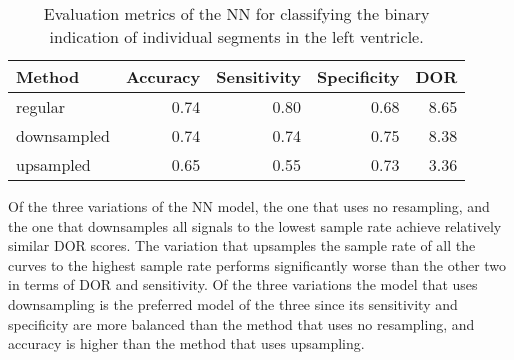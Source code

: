 \begin{table*}[htb]
    \centering
    \begin{tabular}{lrrrr}
        \toprule
        Method      &  Accuracy &  Sensitivity &  Specificity &  DOR \\
        \midrule
        regular     &      0.74 &         0.80 &         0.68 & 8.65 \\
        downsampled &      0.74 &         0.74 &         0.75 & 8.38 \\
        upsampled   &      0.65 &         0.55 &         0.73 & 3.36 \\
        \bottomrule
    \end{tabular}
    \caption{Evaluation metrics of the NN for classifying the binary indication of individual segments in the left ventricle.}
    \label{tab:NN_segm_ind_perf}
\end{table*}

Of the three variations of the NN model, the one that uses no resampling, and the one that downsamples all signals to the lowest sample rate achieve relatively similar DOR scores. 
The variation that upsamples the sample rate of all the curves to the highest sample rate performs significantly worse than the other two in terms of DOR and sensitivity. 
Of the three variations the model that uses downsampling is the preferred model of the three since its sensitivity and specificity are more balanced than the method that uses no resampling,
and accuracy is higher than the method that uses upsampling.

\begin{comment}
[ ] \textbf{Comment on spread of DOR.}
    * Of the three variations of the NN model, the one that uses no resampling, and the one that downsamples all signals to the lowest sample rate achieve relatively similar DOR scores. 
    * The variation that upsamples the sample rate of all the curves to the highest sample rate performs significantly worse than the other two in terms of DOR and sensitivity. 
[ ] \textbf{Comment on spread of sensitivity and specificity.}
[ ] \textbf{Comment on common traits in the high performing methods.} Here you can refer to raw performance results in appendix.
[ ] \textbf{Comment on common traits in the low performing methods.} Here you can refer to raw performance results in appendix.
[ ] \textbf{Select one - three methods that are good contendors for being the best method/model in the group and comment on their traits}
    * Of the three variations the model that uses downsampling is the preferred model of the three since its sensitivity and specificity are more balanced than the method that uses no resampling,
      and accuracy is higher than the method that uses upsampling.
\textbf{IF NOT CLUSTERING METHOD}
[ ] \textbf{Make arguments for and against the top three methods in terms of accuracy, sensitivity, specificity, and DOR, and make an informed choice.}
\end{comment}

